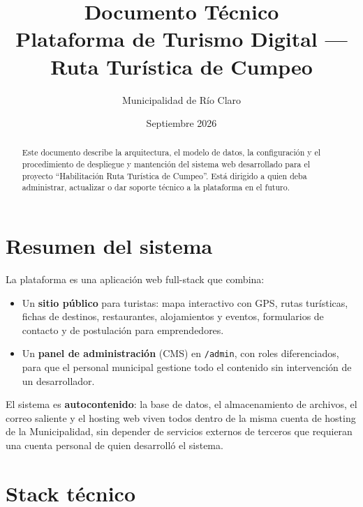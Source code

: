 \documentclass[11pt,a4paper]{article}
\title{\textbf{Documento Técnico}\\[0.3em]\large Plataforma de Turismo Digital — Ruta Turística de Cumpeo}
\author{Municipalidad de Río Claro}
\date{Septiembre 2026}
\begin{document}
\maketitle

\begin{abstract}
\noindent Este documento describe la arquitectura, el modelo de datos, la configuración y el procedimiento de despliegue y mantención del sistema web desarrollado para el proyecto ``Habilitación Ruta Turística de Cumpeo''. Está dirigido a quien deba administrar, actualizar o dar soporte técnico a la plataforma en el futuro.
\end{abstract}

\tableofcontents
\newpage

\section{Resumen del sistema}

La plataforma es una aplicación web full-stack que combina:
\begin{itemize}
  \item Un \textbf{sitio público} para turistas: mapa interactivo con GPS, rutas turísticas, fichas de destinos, restaurantes, alojamientos y eventos, formularios de contacto y de postulación para emprendedores.
  \item Un \textbf{panel de administración} (CMS) en \texttt{/admin}, con roles diferenciados, para que el personal municipal gestione todo el contenido sin intervención de un desarrollador.
\end{itemize}

El sistema es \textbf{autocontenido}: la base de datos, el almacenamiento de archivos, el correo saliente y el hosting web viven todos dentro de la misma cuenta de hosting de la Municipalidad, sin depender de servicios externos de terceros que requieran una cuenta personal de quien desarrolló el sistema.

\section{Stack técnico}
\end{document}
